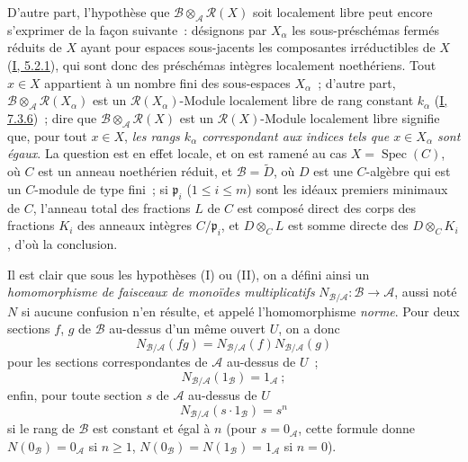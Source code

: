 \begin{env}[6.5.1]
D'autre part, l'hypothèse que
$\mathcal{B}\otimes_{\mathcal{A}}\mathcal{R}(X)$ soit localement libre peut
encore s'exprimer de la façon suivante~: désignons par $X_\alpha$ les
sous-préschémas fermés réduits de $X$ ayant pour espaces sous-jacents les
composantes irréductibles de $X$ (\hyperref[I.5.2.1-fr]{I, 5.2.1}), qui sont
donc des préschémas intègres localement noethériens. Tout $x\in X$ appartient
à un nombre fini des sous-espaces $X_\alpha$~; d'autre part,
$\mathcal{B}\otimes_{\mathcal{A}}\mathcal{R}(X_\alpha)$ est un
$\mathcal{R}(X_\alpha)$-Module localement libre de rang constant $k_\alpha$
(\hyperref[I.7.3.6-fr]{I, 7.3.6})~; dire que
$\mathcal{B}\otimes_{\mathcal{A}}\mathcal{R}(X)$ est un
$\mathcal{R}(X)$-Module localement libre signifie que, pour tout $x\in X$,
\emph{les rangs $k_\alpha$ correspondant aux indices tels que $x\in X_\alpha$
sont égaux}. La question est en effet locale, et on est ramené au cas
$X=\operatorname{Spec}(C)$, où $C$ est un anneau noethérien réduit, et
$\mathcal{B}=\widetilde{D}$, où $D$ est une $C$-algèbre qui est un $C$-module
de type fini~; si $\mathfrak{p}_i$ ($1\leq i\leq m$) sont les idéaux premiers
minimaux de $C$, l'anneau total des fractions $L$ de $C$ est composé direct
des corps des fractions $K_i$ des anneaux intègres $C/\mathfrak{p}_i$, et
$D\otimes_C L$ est somme directe des $D\otimes_C K_i$, d'où la conclusion.

Il est clair que sous les hypothèses (I) ou (II), on a défini ainsi un
\emph{homomorphisme de faisceaux de monoïdes multiplicatifs}
$N_{\mathcal{B}/\mathcal{A}}:\mathcal{B}\to\mathcal{A}$, aussi noté $N$ si
aucune confusion n'en résulte, et appelé l'homomorphisme \emph{norme}. Pour
deux sections $f$, $g$ de $\mathcal{B}$ au-dessus d'un même ouvert $U$, on a
donc
\[
\label{II.6.5.1.1-fr}
N_{\mathcal{B}/\mathcal{A}}(fg)
=N_{\mathcal{B}/\mathcal{A}}(f)N_{\mathcal{B}/\mathcal{A}}(g)
\tag{6.5.1.1}
\]
pour les sections correspondantes de $\mathcal{A}$ au-dessus de $U$~;
\[
\label{II.6.5.1.2-fr}
N_{\mathcal{B}/\mathcal{A}}(1_{\mathcal{B}})=1_{\mathcal{A}}~;
\tag{6.5.1.2}
\]
enfin, pour toute section $s$ de $\mathcal{A}$ au-dessus de $U$
\[
\label{II.6.5.1.3-fr}
N_{\mathcal{B}/\mathcal{A}}(s\cdot1_{\mathcal{B}})=s^n
\tag{6.5.1.3}
\]
si le rang de $\mathcal{B}$ est constant et égal à $n$ (pour
$s=0_{\mathcal{A}}$, cette formule donne
$N(0_{\mathcal{B}})=0_{\mathcal{A}}$ si $n\geq1$,
$N(0_{\mathcal{B}})=N(1_{\mathcal{B}})=1_{\mathcal{A}}$ si $n=0$).


\end{env}
